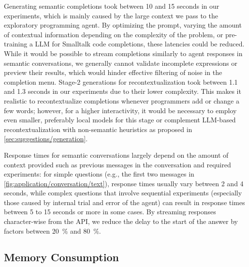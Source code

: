 Generating semantic completions took between 10 and 15 seconds in our experiments, which is mainly caused by the large context we pass to the exploratory programming agent.
By optimizing the prompt, varying the amount of contextual information depending on the complexity of the problem, or pre-training a LLM for Smalltalk code completions, these latencies could be reduced.
While it would be possible to stream completions similarly to agent responses in semantic conversations, we generally cannot validate incomplete expressions or preview their results, which would hinder effective filtering of noise in the completion menu.
Stage-2 generations for recontextualization took between 1.1 and 1.3 seconds in our experiments due to their lower complexity.
This makes it realistic to recontextualize completions whenever programmers add or change a few words; however, for a higher interactivity, it would be necessary to employ even smaller, preferably local models for this stage or complement LLM-based recontextualization with non-semantic heuristics as proposed in \cref{sec:suggestions/generation}.

Response times for semantic conversations largely depend on the amount of context provided such as previous messages in the conversation and required experiments:
for simple questions (e.g., the first two messages in \cref{fig:application/conversation/text}), response times usually vary between 2 and 4 seconds, while complex questions that involve sequential experiments (especially those caused by internal trial and error of the agent) can result in response times between 5 to 15 seconds or more in some cases.
By streaming responses character-wise from the API, we reduce the delay to the start of the answer by factors between \qty{20}{\percent} and \qty{80}{\percent}.

\subsection{Memory Consumption}
\label{sec:discussion/performance/memory}

